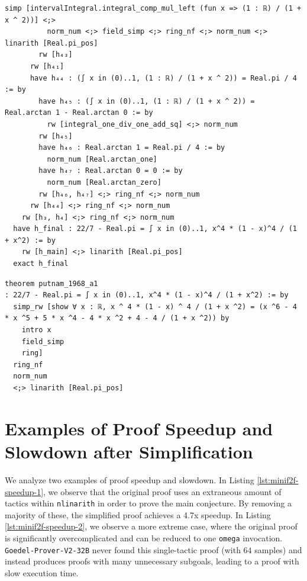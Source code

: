 \begin{tcolorbox}[colback=lightblue, boxrule=0pt, arc=5pt, outer arc=5pt, before skip=0pt, after skip=0pt, boxsep=0pt]
\begin{minipage}[t]{0.99\textwidth}
\begin{lstlisting}[language=lean, breaklines=true, style=mystyletiny]
          simp [intervalIntegral.integral_comp_mul_left (fun x => (1 : ℝ) / (1 + x ^ 2))] <;> 
          norm_num <;> field_simp <;> ring_nf <;> norm_num <;> linarith [Real.pi_pos]
        rw [h₄₃]
      rw [h₄₁]
      have h₄₄ : (∫ x in (0)..1, (1 : ℝ) / (1 + x ^ 2)) = Real.pi / 4 := by
        have h₄₅ : (∫ x in (0)..1, (1 : ℝ) / (1 + x ^ 2)) = Real.arctan 1 - Real.arctan 0 := by
          rw [integral_one_div_one_add_sq] <;> norm_num
        rw [h₄₅]
        have h₄₆ : Real.arctan 1 = Real.pi / 4 := by
          norm_num [Real.arctan_one]
        have h₄₇ : Real.arctan 0 = 0 := by
          norm_num [Real.arctan_zero]
        rw [h₄₆, h₄₇] <;> ring_nf <;> norm_num
      rw [h₄₄] <;> ring_nf <;> norm_num
    rw [h₃, h₄] <;> ring_nf <;> norm_num
  have h_final : 22/7 - Real.pi = ∫ x in (0)..1, x^4 * (1 - x)^4 / (1 + x^2) := by
    rw [h_main] <;> linarith [Real.pi_pos]
  exact h_final
\end{lstlisting}
\end{minipage}

\begin{minipage}[t]{0.99\textwidth}
\begin{lstlisting}[caption={Original Proof (Length 1097) and Simplified Proof (Length 76)},label={lst:examples-tail}, language=lean, breaklines=true, style=mystyletiny]
theorem putnam_1968_a1
: 22/7 - Real.pi = ∫ x in (0)..1, x^4 * (1 - x)^4 / (1 + x^2) := by
  simp_rw [show ∀ x : ℝ, x ^ 4 * (1 - x) ^ 4 / (1 + x ^2) = (x ^6 - 4 * x ^5 + 5 * x ^4 - 4 * x ^2 + 4 - 4 / (1 + x ^2)) by
    intro x
    field_simp
    ring]
  ring_nf
  norm_num
  <;> linarith [Real.pi_pos]
\end{lstlisting}
\end{minipage}
\end{tcolorbox}


  
\newpage

\section{Examples of Proof Speedup and Slowdown after Simplification} \label{sec:appendix-proof-speedup}
We analyze two examples of proof speedup and slowdown. In Listing \ref{lst:minif2f-speedup-1}, we observe that the original proof uses an extraneous amount of tactics within \texttt{nlinarith} in order to prove the main conjecture. By removing a majority of these, the simplified proof achieves a 4.7x speedup. In Listing  \ref{lst:minif2f-speedup-2}, we observe a more extreme case, where the original proof is significantly overcomplicated and can be reduced to one \texttt{omega} invocation. \texttt{Goedel-Prover-V2-32B} never found this single-tactic proof (with $64$ samples) and instead produces proofs with many unnecessary subgoals, leading to a proof with slow execution time.

